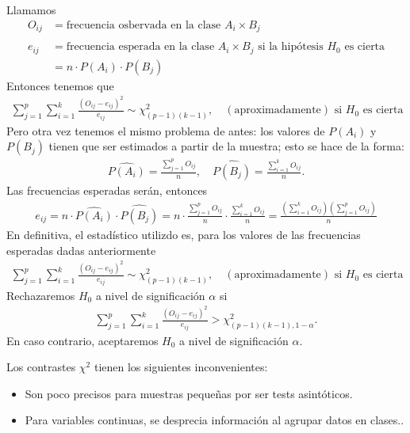 Llamamos
\begin{align*}
    O_{ij} & = \text{frecuencia osbervada en la clase $A_i \times B_j$}                                \\ \\
    e_{ij} & = \text{frecuencia esperada en la clase $A_i \times B_j$ si la hipótesis $H_0$ es cierta} \\
           & = n \cdot P(A_i) \cdot P(B_j)
\end{align*}
Entonces tenemos que
\begin{align*}
    \sum_{j=1}^{p}\sum_{i=1}^{k} \frac{(O_{ij} - e_{ij})^2}{e_{ij}} \sim \chi^2_{(p-1)(k-1)}, \quad (\text{aproximadamente}) \text{ si $H_0$ es cierta}
\end{align*}
Pero otra vez tenemos el mismo problema de antes: los valores de $P(A_i)$ y $P(B_j)$ tienen que ser estimados a partir de la muestra; esto se hace de la forma:
\begin{align*}
    \widehat{P(A_i)} = \frac{\sum_{j=1}^{p} O_{ij}}{n}, \quad \widehat{P(B_j)} = \frac{\sum_{i=1}^{k} O_{ij}}{n}.
\end{align*}
Las frecuencias esperadas serán, entonces
\begin{align*}
    e_{ij} = n \cdot \widehat{P(A_i)} \cdot \widehat{P(B_j)} = n \cdot \frac{\sum_{j=1}^{p} O_{ij}}{n} \cdot  \frac{\sum_{i=1}^{k} O_{ij}}{n} = \frac{\left(\sum_{i=1}^{k} O_{ij}\right)\left(\sum_{j=1}^{p} O_{ij}\right)}{n}
\end{align*}
En definitiva, el estadístico utilizdo es, para los valores de las frecuencias esperadas dadas anteriormente
\begin{align*}
    \sum_{j=1}^{p}\sum_{i=1}^{k} \frac{(O_{ij} - e_{ij})^2}{e_{ij}} \sim \chi^2_{(p-1)(k-1)}, \quad (\text{aproximadamente}) \text{ si $H_0$ es cierta}
\end{align*}
Rechazaremos $H_0$ a nivel de significación $\alpha$ si
\begin{align*}
    \sum_{j=1}^{p}\sum_{i=1}^{k} \frac{(O_{ij} - e_{ij})^2}{e_{ij}} > \chi^2_{(p-1)(k-1), 1 - \alpha}.
\end{align*}
En caso contrario, aceptaremos $H_0$ a nivel de significación $\alpha$.
\begin{obs}
    Los contrastes $\chi^2$ tienen los siguientes inconvenientes:
    \begin{itemize}
        \item Son poco precisos para muestras pequeñas por ser tests asintóticos.
        \item Para variables continuas, se desprecia información al agrupar datos en clases..
    \end{itemize}
\end{obs}